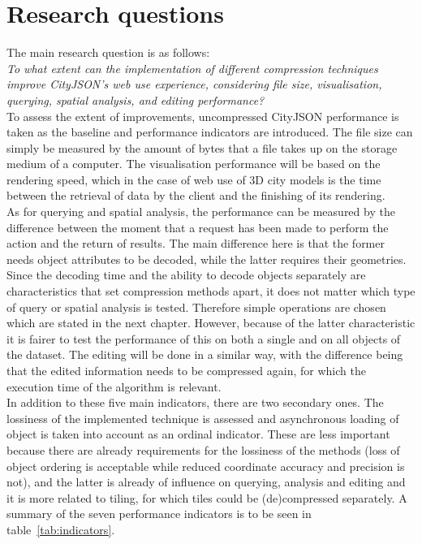 \chapter{Research questions}
\label{chap:rq}

The main research question is as follows:\\
\textit{To what extent can the implementation of different compression techniques improve CityJSON’s web use experience, considering file size, visualisation, querying, spatial analysis, and editing performance?}\\


To assess the extent of improvements, uncompressed CityJSON performance is taken as the baseline and performance indicators are introduced.
The file size can simply be measured by the amount of bytes that a file takes up on the storage medium of a computer.
The visualisation performance will be based on the rendering speed, which in the case of web use of 3D city models is the time between the retrieval of data by the client and the finishing of its rendering.\\

As for querying and spatial analysis, the performance can be measured by the difference between the moment that a request has been made to perform the action and the return of results.
The main difference here is that the former needs object attributes to be decoded, while the latter requires their geometries.
Since the decoding time and the ability to decode objects separately are characteristics that set compression methods apart, it does not matter which type of query or spatial analysis is tested.
Therefore simple operations are chosen which are stated in the next chapter.
However, because of the latter characteristic it is fairer to test the performance of this on both a single and on all objects of the dataset.
The editing will be done in a similar way, with the difference being that the edited information needs to be compressed again, for which the execution time of the algorithm is relevant.
\\

In addition to these five main indicators, there are two secondary ones.
The lossiness of the implemented technique is assessed and asynchronous loading of object is taken into account as an ordinal indicator.
These are less important because there are already requirements for the lossiness of the methods (loss of object ordering is acceptable while reduced coordinate accuracy and precision is not), and the latter is already of influence on querying, analysis and editing and it is more related to tiling, for which tiles could be (de)compressed separately.
A summary of the seven performance indicators is to be seen in table~\ref{tab:indicators}.


